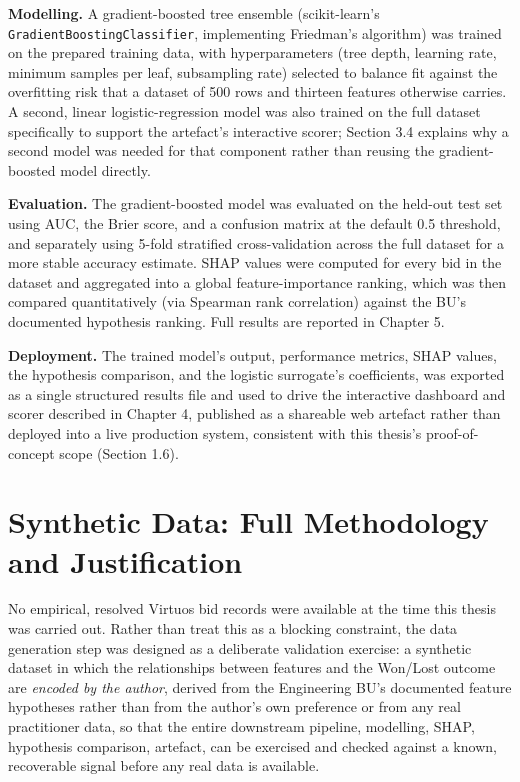 \textbf{Modelling.} A gradient-boosted tree ensemble (scikit-learn's
\texttt{GradientBoostingClassifier}, implementing Friedman's
\citeyearpar{friedman2001greedy} algorithm) was trained on the prepared
training data, with hyperparameters (tree depth, learning rate, minimum
samples per leaf, subsampling rate) selected to balance fit against the
overfitting risk that a dataset of 500 rows and thirteen features
otherwise carries. A second, linear logistic-regression model was also
trained on the full dataset specifically to support the artefact's
interactive scorer; Section 3.4 explains why a second model was needed
for that component rather than reusing the gradient-boosted model
directly.

\textbf{Evaluation.} The gradient-boosted model was evaluated on the
held-out test set using AUC, the Brier score, and a confusion matrix at
the default 0.5 threshold, and separately using 5-fold stratified
cross-validation across the full dataset for a more stable accuracy
estimate. SHAP values were computed for every bid in the dataset and
aggregated into a global feature-importance ranking, which was then
compared quantitatively (via Spearman rank correlation) against the BU's
documented hypothesis ranking. Full results are reported in Chapter 5.

\textbf{Deployment.} The trained model's output, performance metrics,
SHAP values, the hypothesis comparison, and the logistic surrogate's
coefficients, was exported as a single structured results file and used
to drive the interactive dashboard and scorer described in Chapter 4,
published as a shareable web artefact rather than deployed into a live
production system, consistent with this thesis's proof-of-concept scope
(Section 1.6).

\hypertarget{synthetic-data-full-methodology-and-justification}{%
\section{Synthetic Data: Full Methodology and
Justification}\label{synthetic-data-full-methodology-and-justification}}

No empirical, resolved Virtuos bid records were available at the time
this thesis was carried out. Rather than treat this as a blocking
constraint, the data generation step was designed as a deliberate
validation exercise: a synthetic dataset in which the relationships
between features and the Won/Lost outcome are \emph{encoded by the
author}, derived from the Engineering BU's documented feature hypotheses
rather than from the author's own preference or from any real
practitioner data, so that the entire downstream pipeline, modelling,
SHAP, hypothesis comparison, artefact, can be exercised and checked
against a known, recoverable signal before any real data is available.

